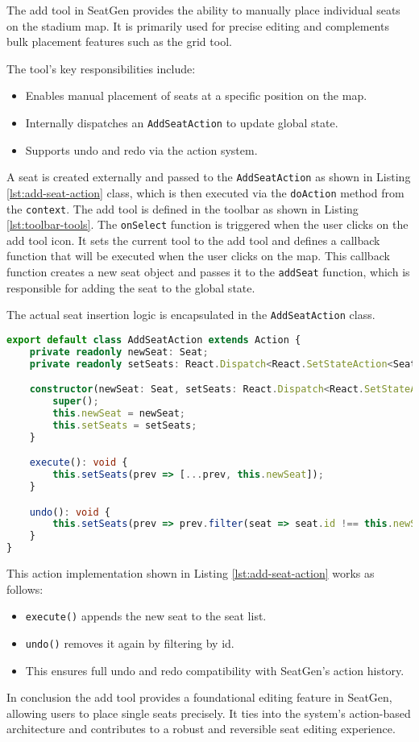 The add tool in SeatGen provides the ability to manually place individual seats on the stadium map. It is primarily used for precise editing and complements bulk placement features such as the grid tool.

The tool’s key responsibilities include:
\begin{itemize}
    \item Enables manual placement of seats at a specific position on the map.
    \item Internally dispatches an \texttt{AddSeatAction} to update global state.
    \item Supports undo and redo via the action system.
\end{itemize}

A seat is created externally and passed to the \texttt{AddSeatAction} as shown in Listing \ref{lst:add-seat-action} class, which is then executed via the \texttt{doAction} method from the \texttt{context}. The add tool is defined in the toolbar as shown in Listing \ref{lst:toolbar-tools}. The \texttt{onSelect} function is triggered when the user clicks on the add tool icon. It sets the current tool to the add tool and defines a callback function that will be executed when the user clicks on the map. This callback function creates a new seat object and passes it to the \texttt{addSeat} function, which is responsible for adding the seat to the global state.

The actual seat insertion logic is encapsulated in the \texttt{AddSeatAction} class.

\begin{lstlisting}[language=TypeScript, caption=AddSeatAction Implementation, label=lst:add-seat-action]
export default class AddSeatAction extends Action {
    private readonly newSeat: Seat;
    private readonly setSeats: React.Dispatch<React.SetStateAction<Seat[]>>;

    constructor(newSeat: Seat, setSeats: React.Dispatch<React.SetStateAction<Seat[]>>) {
        super();
        this.newSeat = newSeat;
        this.setSeats = setSeats;
    }

    execute(): void {
        this.setSeats(prev => [...prev, this.newSeat]);
    }

    undo(): void {
        this.setSeats(prev => prev.filter(seat => seat.id !== this.newSeat.id));
    }
}
\end{lstlisting}

This action implementation shown in Listing \ref{lst:add-seat-action} works as follows:
\begin{itemize}
    \item \texttt{execute()} appends the new seat to the seat list.
    \item \texttt{undo()} removes it again by filtering by id.
    \item This ensures full undo and redo compatibility with SeatGen’s action history.
\end{itemize}

In conclusion the add tool provides a foundational editing feature in SeatGen, allowing users to place single seats precisely. It ties into the system's action-based architecture and contributes to a robust and reversible seat editing experience.
